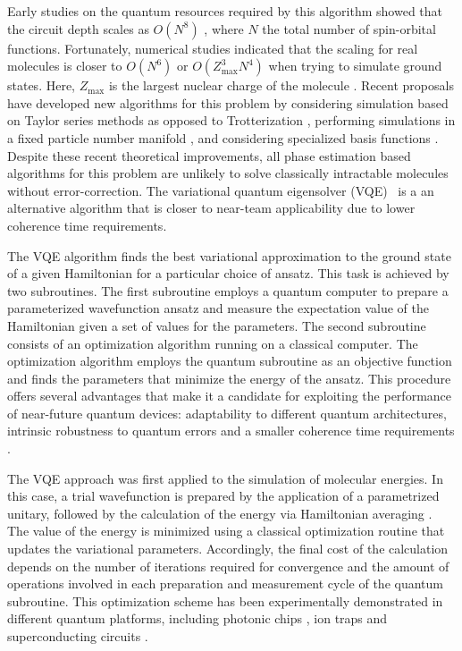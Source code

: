 \documentclass[superscriptaddress,aps,pra,twocolumn,nofootinbib,babel]{revtex4-1}
\begin{document}
Early studies on the quantum resources required by this algorithm showed that the circuit depth scales as $O(N^8)$ \cite{Hastings.QIC.15.1.2015}, where $N$ the total number of spin-orbital functions. Fortunately, numerical studies indicated that the scaling for real molecules is closer to $O(N^6)$ \cite{Poulin.QIC.15.361.2015} or $O(Z_{\mathrm{max}}^3 N^4)$ when trying to simulate ground states. Here, $Z_{\mathrm{max}}$ is the largest nuclear charge of the molecule \cite{Babbush.PRA.91.22311.2015}. Recent proposals have developed new algorithms for this problem by considering simulation based on Taylor series methods as opposed to Trotterization \cite{BabbushSparse1,Kivlichan2017BoundingSpace}, performing simulations in a fixed particle number manifold \cite{BabbushSparse2,Toloui2013,BabbushSymmetry,Bravyi2017,Steudtner2017}, and considering specialized basis functions \cite{BabbushLow,Kivlichan2017}. Despite these recent theoretical improvements, all phase estimation based algorithms for this problem are unlikely to solve classically intractable molecules without error-correction. The variational quantum eigensolver (VQE)~\cite{Peruzzo.NC.5.4213.2014,Mcclean.NJP.18.023023.2016,Wecker.PRA.92.042303.2015} is a an alternative algorithm that is closer to near-team applicability due to lower coherence time requirements.

The VQE algorithm finds the best variational approximation to the ground state of a given Hamiltonian for a particular choice of ansatz. This task is achieved by two subroutines. The first subroutine employs a quantum computer to prepare a parameterized wavefunction ansatz and measure the expectation value of the Hamiltonian given a set of values for the parameters. The second subroutine consists of an optimization algorithm running on a classical computer. The optimization algorithm employs the quantum subroutine as an objective function and finds the parameters that minimize the energy of the ansatz. This procedure offers several advantages that make it a candidate for exploiting the performance of near-future quantum devices:  adaptability to different quantum architectures, intrinsic robustness to quantum errors \cite{mcclean2016hybrid,Omalley.PRX.6.031007.2016} and a smaller coherence time requirements \cite{Mcclean.NJP.18.023023.2016}.

The VQE approach was first applied to the simulation of molecular energies. In this case, a trial wavefunction is prepared by the application of a parametrized unitary, followed by the calculation of the energy via Hamiltonian averaging \cite{McClean.JPCL.5.4368.2014,Mcclean.NJP.18.023023.2016}. The value of the energy is minimized using a classical optimization routine that updates the variational parameters. Accordingly, the final cost of the calculation depends on the number of iterations required for convergence and the amount of operations involved in each preparation and measurement cycle of the quantum subroutine. This optimization scheme has been experimentally demonstrated in different quantum platforms, including photonic chips \cite{Peruzzo.NC.5.4213.2014}, ion traps \cite{Shen.apa...2015,Hempel.inprep} and superconducting circuits \cite{Omalley.PRX.6.031007.2016,Kandala2017}.
\end{document}
